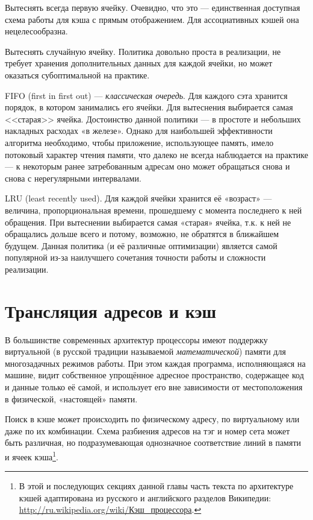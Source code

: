\begin{itemize*}
\item    Вытеснять всегда первую ячейку. Очевидно, что это --- единственная доступная схема работы для кэша с прямым отображением. Для ассоциативных кэшей она нецелесообразна.

\item    Вытеснять случайную ячейку. Политика довольно проста в реализации, не требует хранения дополнительных данных для каждой ячейки, но может оказаться субоптимальной на практике.

\item    FIFO (\abbr first in first out) --- \textit{классическая очередь}. Для каждого сэта хранится порядок, в котором занимались его ячейки. Для вытеснения выбирается самая <<старая>> ячейка. Достоинство данной политики --- в простоте и небольших накладных расходах «в железе». Однако для наибольшей эффективности алгоритма необходимо, чтобы приложение, использующее память, имело потоковый характер чтения памяти, что далеко не всегда наблюдается на практике --- к некоторым ранее затребованным адресам оно может обращаться снова и снова с нерегулярными интервалами.

\item    LRU (\abbr least recently used). Для каждой ячейки хранится её «возраст» --- величина, пропорциональная времени, прошедшему с момента последнего к ней обращения. При вытеснении выбирается самая «старая» ячейка, т.к. к ней не обращались дольше всего и потому, возможно, не обратятся в ближайшем будущем. Данная политика (и её различные оптимизации) является самой популярной из-за наилучшего сочетания точности работы и сложности реализации.

\end{itemize*}

\section{Трансляция адресов и кэш}

В большинстве современных архитектур процессоры имеют поддержку виртуальной (в русской традиции называемой \textit{математической}) памяти для многозадачных режимов работы. При этом каждая программа, исполняющаяся на машине, видит собственное упрощённое адресное пространство, содержащее код и данные только её самой, и использует его вне зависимости от местоположения в физической, «настоящей» памяти. 

Поиск в кэше может происходить по физическому адресу, по виртуальному или даже по их комбинации. Схема разбиения адресов на тэг и номер сета может быть различная, но подразумевающая однозначное соответствие линий в памяти и ячеек кэша\footnote{В этой и последующих секциях данной главы часть текста по архитектуре кэшей адаптирована из русского и английского разделов Википедии: \url{http://ru.wikipedia.org/wiki/Кэш_процессора}.}.

